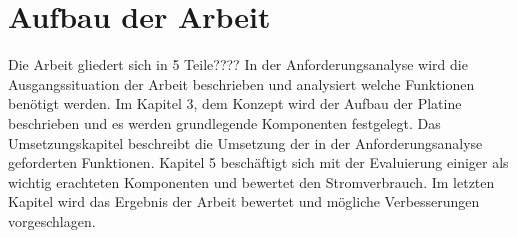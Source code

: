 


\section{Aufbau der Arbeit}

Die Arbeit gliedert sich in 5 Teile???? 
In der Anforderungsanalyse wird die Ausgangssituation der Arbeit beschrieben und
analysiert welche Funktionen benötigt werden. Im Kapitel 3, dem Konzept
wird der Aufbau der Platine beschrieben und es werden grundlegende Komponenten
festgelegt. Das Umsetzungskapitel beschreibt die Umsetzung der in der Anforderungsanalyse
geforderten Funktionen. Kapitel 5 beschäftigt sich mit der Evaluierung einiger
als wichtig erachteten Komponenten und bewertet den Stromverbrauch.
Im letzten Kapitel wird das Ergebnis der Arbeit bewertet und mögliche Verbesserungen
vorgeschlagen.



